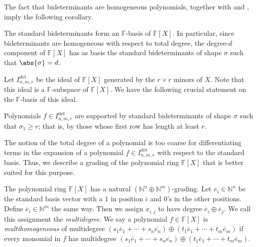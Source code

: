\documentclass[10pt,a4paper]{amsart}
\newcommand*\N{\mathbb{N}}
\newcommand*\F{\mathbb{F}}
\begin{document}
The fact that bideterminants are homogeneous polynomials, together with  and , imply the following corollary.
\begin{cor}\label{cor:det-basis}
The standard bideterminants form an $\F$-basis of $\F[X]$.
In particular, since bideterminants are homogeneous with respect to total degree, the degree-$d$ component of $\F[X]$ has as basis the standard bideterminants of shape $\sigma$ such that $\abs{\sigma} = d$.
\end{cor}

Let $I^{\det}_{n, m, r}$ be the ideal of $\F[X]$ generated by the $r \times r$ minors of $X$.
Note that this ideal is a $\F$-subspace of $\F[X]$.
We have the following crucial statement on the $\F$-basis of this ideal.
\begin{prop}[{\cite[Corollary 1.7]{BC03}}]\label{prop:det_shape}
    Polynomials $f \in I^{\det}_{n, m, r}$ are supported by standard bideterminants of shape $\sigma$ such that $\sigma_1 \geq r$; that is, by those whose first row has length at least $r$.
\end{prop}

The notion of the total degree of a polynomial is too coarse for differentiating terms in the expansion of a polynomial $f \in I^{\det}_{n, m, r}$ with respect to the standard basis.
Thus, we describe a grading of the polynomial ring $\F[X]$ that is better suited for this purpose.
\begin{defn}\label{defn:multideg}
    The polynomial ring $\F[X]$ has a natural $(\N^n \oplus \N^m)$-grading.
    Let $\overline{e}_i \in \N^n$ be the standard basis vector with a $1$ in position $i$ and $0$'s in the other positions.
    Define $\overline{e}_i \in \N^m$ the same way.
    Then we assign $x_{i, j}$ to have degree $\overline{e}_i \oplus \overline{e}_j$.
    We call this assignment the \emph{multidegree}.
    We say a polynomial $f \in \F[X]$ is \emph{multihomogeneous} of multidegree $(s_1 \overline{e}_1 + \cdots + s_n \overline{e_n}) \oplus (t_1 \overline{e}_1 + \cdots + t_m \overline{e}_m)$ if every monomial in $f$ has multidegree $(s_1 \overline{e}_1 + \cdots + s_n \overline{e_n}) \oplus (t_1 \overline{e}_1 + \cdots + t_m \overline{e}_m)$.
\end{defn} 
\end{document}
